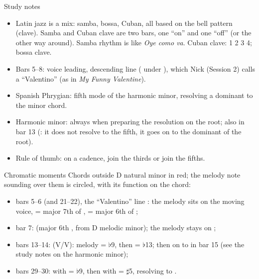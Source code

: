 \begin{study}{Study notes}
\begin{itemize}\setlength{\itemsep}{0pt}
\item Latin jazz is a mix: samba, bossa, Cuban, all based on the bell pattern (clave).
  Samba and Cuban clave are two bars, one ``on'' and one ``off'' (or the other way around).
  Samba rhythm is like \emph{Oye como va}. Cuban clave: 1 2 3 4; bossa clave.
\item Bars 5--8: voice leading, descending line ( under ),
  which Nick (Session 2) calls a ``Valentino'' (as in \emph{My Funny Valentine}).
\item Spanish Phrygian: fifth mode of the harmonic minor, resolving a dominant to the minor chord.
\item Harmonic minor: always when preparing the resolution on the root; also in bar 13
  (: it does not resolve to the fifth, it goes on to the dominant of the root).
\item Rule of thumb: on a cadence, join the thirds or join the fifths.
\end{itemize}
\end{study}

\begin{study}{Chromatic moments}
Chords outside D natural minor in \textcolor{chromatic}{red}; the melody note sounding
over them is circled, with its function on the chord:
\begin{itemize}\setlength{\itemsep}{0pt}
\item bars 5--6 (and 21--22), the ``Valentino'' line    :
  the melody sits on the moving voice,  = major 7th of ,  = major 6th of ;
\item bar 7:  (major 6th , from D melodic minor); the melody stays on ;
\item bars 13--14:  (V/V): melody  = $\flat$9, then  = $\flat$13;
  then on to  in bar 15 (see the study notes on the harmonic minor);
\item bars 29--30:  with  = $\flat$9, then  with  = $\sharp$5,
  resolving to .
\end{itemize}
\end{study}
